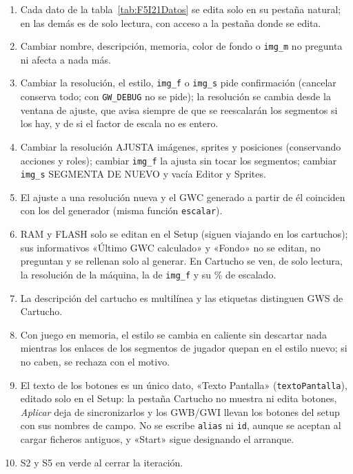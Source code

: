 \begin{enumerate}
	\item Cada dato de la tabla~\ref{tab:F5I21Datos} se edita solo en su pestaña natural; en las demás es de solo lectura, con acceso a la pestaña donde se edita.
	\item Cambiar nombre, descripción, memoria, color de fondo o \texttt{img\_m} no pregunta ni afecta a nada más.
	\item Cambiar la resolución, el estilo, \texttt{img\_f} o \texttt{img\_s} pide confirmación (cancelar conserva todo; con \texttt{GW\_DEBUG} no se pide); la resolución se cambia desde la ventana de ajuste, que avisa siempre de que se reescalarán los segmentos si los hay, y de si el factor de escala no es entero.
	\item Cambiar la resolución AJUSTA imágenes, sprites y posiciones (conservando acciones y roles); cambiar \texttt{img\_f} la ajusta sin tocar los segmentos; cambiar \texttt{img\_s} SEGMENTA DE NUEVO y vacía Editor y Sprites.
	\item El ajuste a una resolución nueva y el GWC generado a partir de él coinciden con los del generador (misma función \texttt{escalar}).
	\item RAM y FLASH solo se editan en el Setup (siguen viajando en los cartuchos); sus informativos «Último GWC calculado» y «Fondo» no se editan, no preguntan y se rellenan solo al generar. En Cartucho se ven, de solo lectura, la resolución de la máquina, la de \texttt{img\_f} y su \% de escalado.
	\item La descripción del cartucho es multilínea y las etiquetas distinguen GWS de Cartucho.
	\item Con juego en memoria, el estilo se cambia en caliente sin descartar nada mientras los enlaces de los segmentos de jugador quepan en el estilo nuevo; si no caben, se rechaza con el motivo.
	\item El texto de los botones es un único dato, «Texto Pantalla» (\texttt{textoPantalla}), editado solo en el Setup: la pestaña Cartucho no muestra ni edita botones, \emph{Aplicar} deja de sincronizarlos y los GWB/GWI llevan los botones del setup con sus nombres de campo. No se escribe \texttt{alias} ni \texttt{id}, aunque se aceptan al cargar ficheros antiguos, y «Start» sigue designando el arranque.
	\item S2 y S5 en verde al cerrar la iteración.
\end{enumerate}